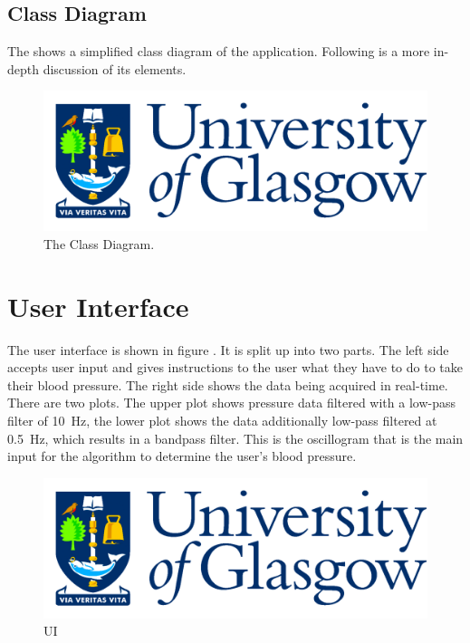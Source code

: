\subsection{Class Diagram}
The  shows a simplified class diagram of the application. Following is a more in-depth discussion of its elements.

\begin{figure}
\centering
\includegraphics[scale=0.125]{GlaLogo.pdf}
\caption{The Class Diagram.}
\label{fig:CD}
\end{figure}


\section{User Interface}
The user interface is shown in figure . It is split up into two parts. The left side accepts user input and gives instructions to the user what they have to do to take their blood pressure. The right side shows the data being acquired in real-time. There are two plots. The upper plot shows pressure data filtered with a low-pass filter of \SI{10}{\Hz}, the lower plot shows the data additionally low-pass filtered at \SI{0.5}{\Hz}, which results in a bandpass filter. This is the oscillogram that is the main input for the algorithm to determine the user's blood pressure.

\begin{figure}
\centering
\includegraphics[scale=0.125]{GlaLogo.pdf}
\caption{UI}
\label{fig:UI}
\end{figure}

